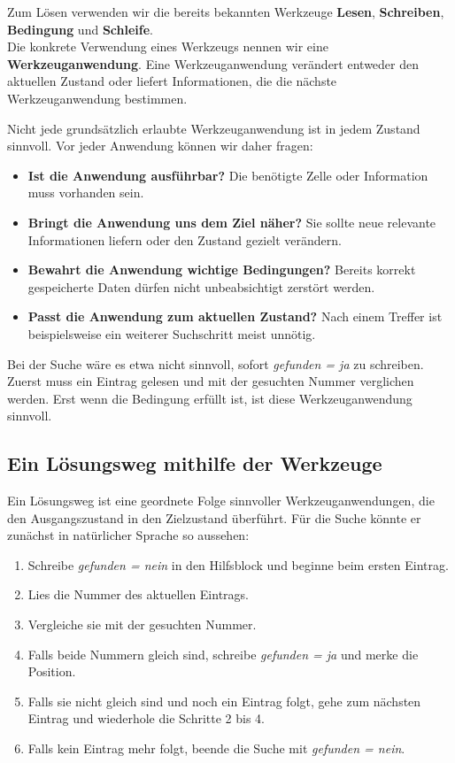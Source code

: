 \documentclass{article}
\begin{document}
Zum Lösen verwenden wir die bereits bekannten Werkzeuge \textbf{Lesen}, \textbf{Schreiben}, \textbf{Bedingung} und \textbf{Schleife}.\\
Die konkrete Verwendung eines Werkzeugs nennen wir eine \textbf{Werkzeuganwendung}. Eine Werkzeuganwendung verändert entweder den aktuellen Zustand oder liefert Informationen, die die nächste Werkzeuganwendung bestimmen.

Nicht jede grundsätzlich erlaubte Werkzeuganwendung ist in jedem Zustand sinnvoll. Vor jeder Anwendung können wir daher fragen:

\begin{itemize}
  \item \textbf{Ist die Anwendung ausführbar?} Die benötigte Zelle oder Information muss vorhanden sein.
  \item \textbf{Bringt die Anwendung uns dem Ziel näher?} Sie sollte neue relevante Informationen liefern oder den Zustand gezielt verändern.
  \item \textbf{Bewahrt die Anwendung wichtige Bedingungen?} Bereits korrekt gespeicherte Daten dürfen nicht unbeabsichtigt zerstört werden.
  \item \textbf{Passt die Anwendung zum aktuellen Zustand?} Nach einem Treffer ist beispielsweise ein weiterer Suchschritt meist unnötig.
\end{itemize}

Bei der Suche wäre es etwa nicht sinnvoll, sofort \emph{gefunden = ja} zu schreiben. Zuerst muss ein Eintrag gelesen und mit der gesuchten Nummer verglichen werden. Erst wenn die Bedingung erfüllt ist, ist diese Werkzeuganwendung sinnvoll.

\subsection{Ein Lösungsweg mithilfe der Werkzeuge}

Ein Lösungsweg ist eine geordnete Folge sinnvoller Werkzeuganwendungen, die den Ausgangszustand in den Zielzustand überführt. Für die Suche könnte er zunächst in natürlicher Sprache so aussehen:

\begin{enumerate}
  \item Schreibe \emph{gefunden = nein} in den Hilfsblock und beginne beim ersten Eintrag.
  \item Lies die Nummer des aktuellen Eintrags.
  \item Vergleiche sie mit der gesuchten Nummer.
  \item Falls beide Nummern gleich sind, schreibe \emph{gefunden = ja} und merke die Position.
  \item Falls sie nicht gleich sind und noch ein Eintrag folgt, gehe zum nächsten Eintrag und wiederhole die Schritte 2 bis 4.
  \item Falls kein Eintrag mehr folgt, beende die Suche mit \emph{gefunden = nein}.
\end{enumerate}
\end{document}
